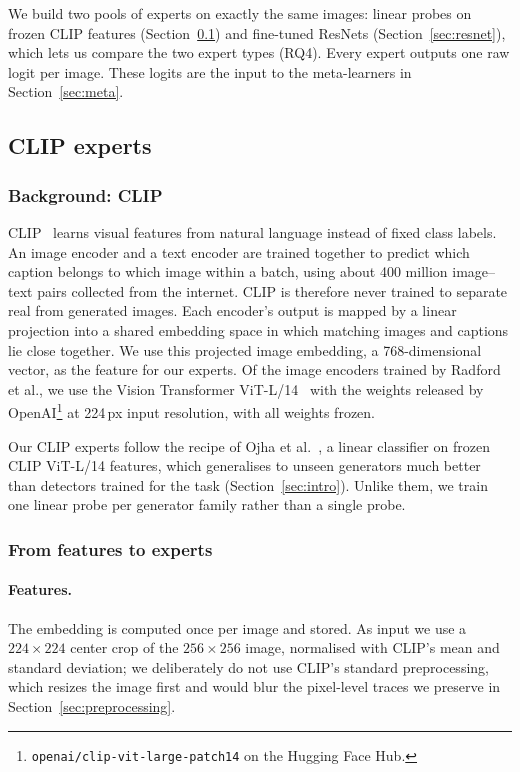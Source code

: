\documentclass[10pt,a4paper]{article}
\begin{document}
We build two pools of experts on exactly the same images: linear probes on frozen CLIP features (Section~\ref{sec:clip}) and fine-tuned ResNets (Section~\ref{sec:resnet}), which lets us compare the two expert types (RQ4). Every expert outputs one raw logit per image. These logits are the input to the meta-learners in Section~\ref{sec:meta}.

\subsection{CLIP experts}\label{sec:clip}

\subsubsection{Background: CLIP}\label{sec:clip-background}

CLIP~\cite{radford2021clip} learns visual features from natural language instead of fixed class labels. An image encoder and a text encoder are trained together to predict which caption belongs to which image within a batch, using about 400 million image--text pairs collected from the internet. CLIP is therefore never trained to separate real from generated images. Each encoder's output is mapped by a linear projection into a shared embedding space in which matching images and captions lie close together. We use this projected image embedding, a 768-dimensional vector, as the feature for our experts. Of the image encoders trained by Radford et al., we use the Vision Transformer ViT-L/14~\cite{dosovitskiy2021vit} with the weights released by OpenAI\footnote{\texttt{openai/clip-vit-large-patch14} on the Hugging Face Hub.} at 224\,px input resolution, with all weights frozen.

Our CLIP experts follow the recipe of Ojha et al.~\cite{ojha2023universal}, a linear classifier on frozen CLIP ViT-L/14 features, which generalises to unseen generators much better than detectors trained for the task (Section~\ref{sec:intro}). Unlike them, we train one linear probe per generator family rather than a single probe.

\subsubsection{From features to experts}

\paragraph{Features.}
The embedding is computed once per image and stored. As input we use a $224\times224$ center crop of the $256\times256$ image, normalised with CLIP's mean and standard deviation; we deliberately do not use CLIP's standard preprocessing, which resizes the image first and would blur the pixel-level traces we preserve in Section~\ref{sec:preprocessing}.
\end{document}
